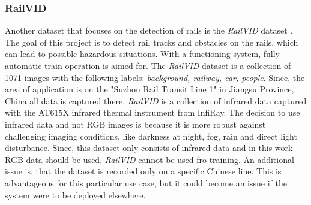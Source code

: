 \subsubsection{RailVID}
Another dataset that focuses on the detection of rails is the \textit{RailVID} dataset \cite{yuan2022railvid}. The goal of this project is to detect rail tracks and obstacles on the rails, which can lead to possible hazardous situations. With a functioning system, fully automatic train operation is aimed for. The \textit{RailVID} dataset is a collection of 1071 images with the following labels: \textit{background, railway, car, people}. Since, the area of application is on the "Suzhou Rail Transit Line 1" in Jiangsu Province, China all data is captured there. \textit{RailVID} is a collection of infrared data captured with the AT615X infrared thermal instrument from InfiRay. The decision to use infrared data and not RGB images is because it is more robust against challenging imaging conditions, like darkness at night, fog, rain and direct light disturbance.
Since, this dataset only consists of infrared data and in this work \ac{RGB} data should be used, \textit{RailVID} cannot be used fro training. An additional issue is, that the dataset is recorded only on a specific Chinese line. This is advantageous for this particular use case, but it could become an issue if the system were to be deployed elsewhere.

